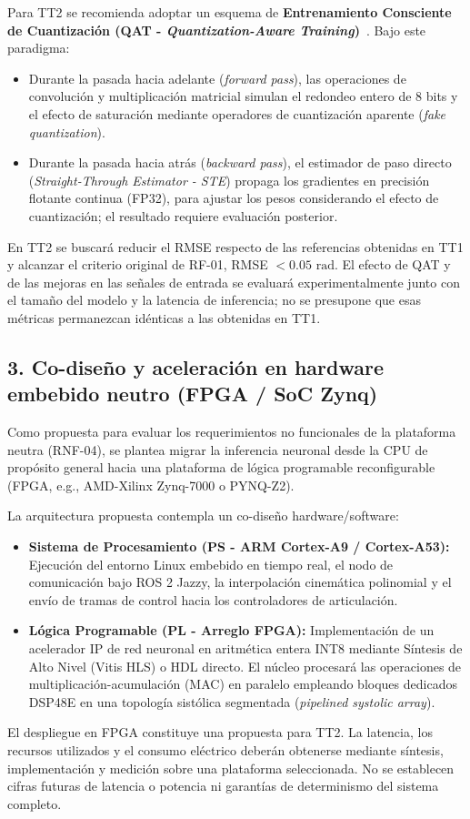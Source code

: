 \documentclass[12pt]{article}
\begin{document}
Para TT2 se recomienda adoptar un esquema de \textbf{Entrenamiento Consciente de Cuantización (QAT - \textit{Quantization-Aware Training})}~\cite{jacob2018quantization}. Bajo este paradigma:
\begin{itemize}
    \item Durante la pasada hacia adelante (\textit{forward pass}), las operaciones de convolución y multiplicación matricial simulan el redondeo entero de 8 bits y el efecto de saturación mediante operadores de cuantización aparente (\textit{fake quantization}).
    \item Durante la pasada hacia atrás (\textit{backward pass}), el estimador de paso directo (\textit{Straight-Through Estimator - STE}) propaga los gradientes en precisión flotante continua (FP32), para ajustar los pesos considerando el efecto de cuantización; el resultado requiere evaluación posterior.
\end{itemize}
En TT2 se buscará reducir el RMSE respecto de las referencias obtenidas en TT1 y alcanzar el criterio original de RF-01, RMSE $<0.05\text{ rad}$. El efecto de QAT y de las mejoras en las señales de entrada se evaluará experimentalmente junto con el tamaño del modelo y la latencia de inferencia; no se presupone que esas métricas permanezcan idénticas a las obtenidas en TT1.

\subsection*{3. Co-diseño y aceleración en hardware embebido neutro (FPGA / SoC Zynq)}

Como propuesta para evaluar los requerimientos no funcionales de la plataforma neutra (RNF-04), se plantea migrar la inferencia neuronal desde la CPU de propósito general hacia una plataforma de lógica programable reconfigurable (FPGA, e.g., AMD-Xilinx Zynq-7000 o PYNQ-Z2).

La arquitectura propuesta contempla un co-diseño hardware/software:
\begin{itemize}
    \item \textbf{Sistema de Procesamiento (PS - ARM Cortex-A9 / Cortex-A53):} Ejecución del entorno Linux embebido en tiempo real, el nodo de comunicación bajo ROS 2 Jazzy, la interpolación cinemática polinomial y el envío de tramas de control hacia los controladores de articulación.
    \item \textbf{Lógica Programable (PL - Arreglo FPGA):} Implementación de un acelerador IP de red neuronal en aritmética entera INT8 mediante Síntesis de Alto Nivel (Vitis HLS) o HDL directo. El núcleo procesará las operaciones de multiplicación-acumulación (MAC) en paralelo empleando bloques dedicados DSP48E en una topología sistólica segmentada (\textit{pipelined systolic array}).
\end{itemize}
El despliegue en FPGA constituye una propuesta para TT2. La latencia, los recursos utilizados y el consumo eléctrico deberán obtenerse mediante síntesis, implementación y medición sobre una plataforma seleccionada. No se establecen cifras futuras de latencia o potencia ni garantías de determinismo del sistema completo.
\end{document}
